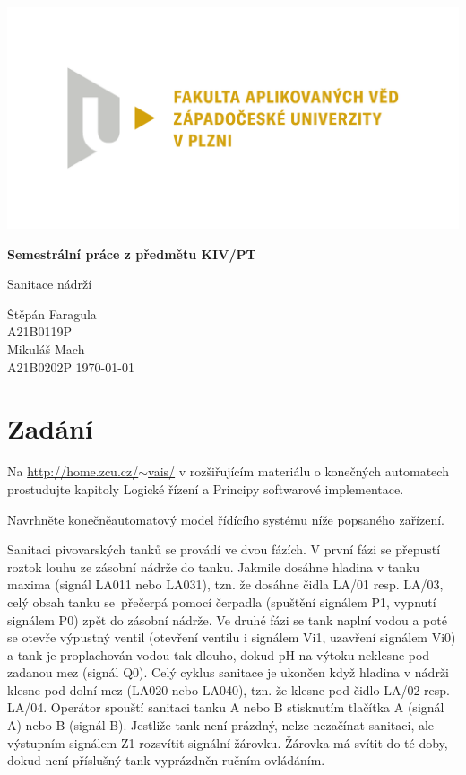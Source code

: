 \documentclass[12pt]{report}
\begin{document}
	
	\begin{titlepage}
		\centering
		\Large
		
		\includegraphics[width=.7\textwidth]{fav}
		
		\vspace{15mm}
		{\Huge\bfseries Semestrální práce z předmětu KIV/PT}
		
		\vspace{5mm}
		{\LARGE Sanitace nádrží}
		
		\vfill
		\raggedright
		Štěpán Faragula\\
		A21B0119P\\
		Mikuláš Mach\\
		A21B0202P
		\hfill 
		\today
	\end{titlepage}
	
	\tableofcontents
	
	\chapter{Zadání}
	Na \href{http://home.zcu.cz/~vais/}{http://home.zcu.cz/$\sim$vais/} v rozšiřujícím materiálu o konečných automatech prostudujte kapitoly Logické řízení a Principy softwarové implementace.
	
	Navrhněte konečněautomatový model řídícího systému níže popsaného zařízení.
	
	Sanitaci pivovarských tanků se provádí ve dvou fázích. V první fázi se přepustí roztok louhu ze zásobní nádrže do tanku. Jakmile dosáhne hladina v tanku maxima (signál LA011 nebo LA031), tzn. že dosáhne čidla LA/01 resp. LA/03, celý obsah tanku se~přečerpá pomocí čerpadla (spuštění signálem P1, vypnutí signálem P0) zpět do zásobní nádrže. Ve druhé fázi se tank naplní vodou a poté se otevře výpustný ventil (otevření ventilu i signálem Vi1, uzavření signálem Vi0) a tank je proplachován vodou tak dlouho, dokud pH na výtoku neklesne pod zadanou mez (signál Q0). Celý cyklus sanitace je ukončen když hladina v nádrži klesne pod dolní mez (LA020 nebo LA040), tzn. že klesne pod čidlo LA/02 resp. LA/04. Operátor spouští sanitaci tanku A nebo B stisknutím tlačítka A (signál A) nebo B (signál B). Jestliže tank není prázdný, nelze nezačínat sanitaci, ale výstupním signálem Z1 rozsvítit signální žárovku. Žárovka má svítit do té doby, dokud není příslušný tank vyprázdněn ručním ovládáním.
	
\end{document}
